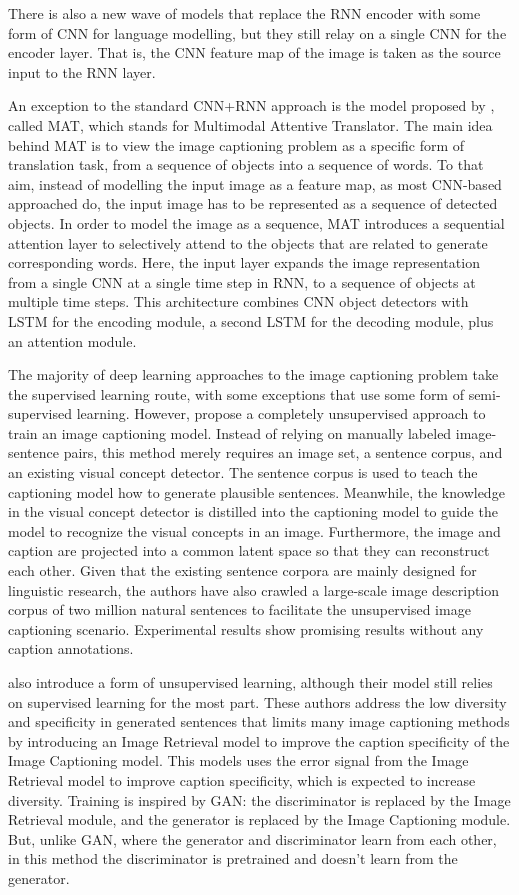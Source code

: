 There is also a new wave of models that replace the RNN encoder with some form of CNN for language modelling, but they still relay on a single CNN for the encoder layer. That is, the CNN feature map of the image is taken as the source input to the RNN layer.

An exception to the standard CNN+RNN approach is the model proposed by \citet{Liu2017_MAT}, called MAT, which stands for Multimodal Attentive Translator. The main idea behind MAT is to view the image captioning problem as a specific form of translation task, from a sequence of objects into a sequence of words. To that aim, instead of modelling the input image as a feature map, as most CNN-based approached do, the input image has to be represented as a sequence of detected objects. In order to model the image as a sequence, MAT introduces a sequential attention layer to selectively attend to the objects that are related to generate corresponding words. Here, the input layer expands the image representation from a single CNN at a single time step in RNN, to a sequence of objects at multiple time steps. This architecture combines CNN object detectors with LSTM for the encoding module, a second  LSTM for the decoding module, plus an attention module.

The majority of deep learning approaches to the image captioning problem take the supervised learning route, with some exceptions that use some form of semi-supervised learning\citep{Pu2016_VAE, Anderson2018_SemiSup}. However, \citet{Feng2018} propose a completely unsupervised
approach to train an image captioning model. Instead of relying on manually labeled image-sentence pairs, this method merely requires an image set, a sentence corpus, and an existing visual concept detector. The sentence corpus is used to teach the captioning model how to generate plausible sentences. Meanwhile, the knowledge in the visual concept detector is distilled into the captioning model to guide the model to recognize the visual concepts in an image. Furthermore, the image and caption are projected into a common latent space so that they can reconstruct each other. Given that the existing sentence corpora are mainly designed for linguistic research, the authors have also  crawled a large-scale image description corpus of two million natural sentences to facilitate the unsupervised image captioning scenario. Experimental results show promising results without any caption annotations.


\citet{Lindh2018} also introduce a form of unsupervised learning, although their model still relies on supervised learning for the most part. These authors address the low diversity and specificity in generated sentences that limits many image captioning methods by  introducing an Image Retrieval model to improve the caption specificity of the Image Captioning model. This models uses the error signal from the Image Retrieval model to improve caption specificity, which is expected to increase diversity. Training is inspired by GAN: the discriminator is replaced by the Image Retrieval module, and the generator is replaced by the Image Captioning module. But, unlike GAN, where the generator and discriminator learn from each other, in this method the discriminator is pretrained and doesn't learn from the generator. 


